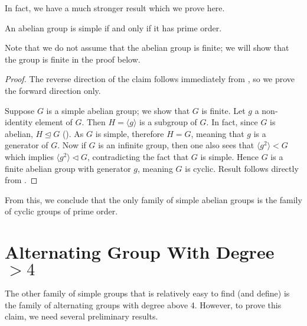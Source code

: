 In fact, we have a much stronger result which we prove here.
\begin{theorem}\label{thrm-abelian-group-simple-iff-cylic-group-of-prime-order}
    An abelian group is simple if and only if it has prime order.
\end{theorem}
Note that we do not assume that the abelian group is finite; we will show that the group is finite in the proof below.
\begin{proof}
    The reverse direction of the claim follows immediately from , so we prove the forward direction only.

    Suppose $G$ is a simple abelian group; we show that $G$ is finite. Let $g$ a non-identity element of $G$. Then $H = \langle g \rangle$ is a subgroup of $G$. In fact, since $G$ is abelian, $H \unlhd G$ (). As $G$ is simple, therefore $H = G$, meaning that $g$ is a generator of $G$. Now if $G$ is an infinite group, then one also sees that $\langle g^2 \rangle < G$ which implies $\langle g^2 \rangle \lhd G$, contradicting the fact that $G$ is simple. Hence $G$ is a finite abelian group with generator $g$, meaning $G$ is cyclic. Result follows directly from .
\end{proof}

From this, we conclude that the only family of simple abelian groups is the family of cyclic groups of prime order.

\section{Alternating Group With Degree $>4$}
The other family of simple groups that is relatively easy to find (and define) is the family of alternating groups with degree above 4. However, to prove this claim, we need several preliminary results.

